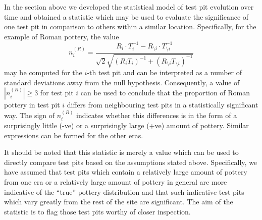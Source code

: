 \documentclass[conference]{IEEEtran}
\begin{document}
In the section above we developed the statistical model of test pit evolution
over time and obtained a statistic which may be used to evaluate the
significance of one test pit in comparison to others within a similar location.
Specifically, for the example of Roman pottery, the value
\[
    n^{(R)}_i = \frac{R_i \cdot T^{-1}_i - R_{\setminus i} \cdot T^{-1}_{\setminus
    i}}{\sqrt{2}\sqrt{(R_i T_i)^{-1} + (R_{\setminus i}T_{\setminus i})^{-1}}}
\]
may be computed for the $i$-th test pit and can be interpreted as a number of
standard deviations away from the null hypothesis. Consequently, a value of
$|n^{(R)}_i| \ge 3$ for test pit $i$ can be used to conclude that the proportion
of Roman pottery in test pit $i$ differs from neighbouring test pits in a
statistically significant way. The sign of $n^{(R)}_i$ indicates whether this
differences is in the form of a surprisingly little (-ve) or a surprisingly
large (+ve) amount of pottery. Similar expressions can be formed for the other
eras.

It should be noted that this statistic is merely a value which can be used to
directly compare test pits based on the assumptions stated above. Specifically,
we have assumed that test pits which contain a relatively large amount of
pottery from one era or a relatively large amount of pottery in general are more
indicative of the ``true'' pottery distribution and that such indicative test
pits which vary greatly from the rest of the site are significant. The aim of
the statistic is to flag those test pits worthy of closer inspection.
\end{document}
